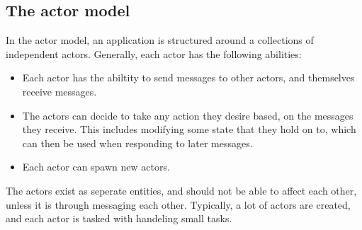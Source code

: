 \documentclass[a4paper]{article}
\begin{document}




\subsection{The actor model}
In the actor model, an application is structured around a collections of
independent actors. Generally, each actor has the following abilities:
\begin{itemize}
\item Each actor has the abiltity to send messages to other actors, and
  themselves receive messages.
\item The actors can decide to take any action they desire based, on the messages
  they receive. This includes modifying some state that they hold on to, which
  can then be used when responding to later messages.
\item Each actor can spawn new actors.
\end{itemize}

\noindent
The actors exist as seperate entities, and should not be able to affect each
other, unless it is through messaging each other. Typically, a lot of actors are
created, and each actor is tasked with handeling small tasks.\\
\end{document}
